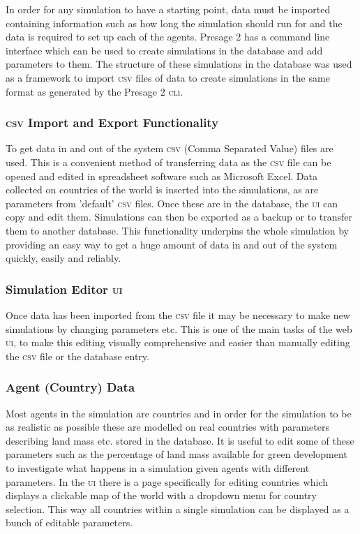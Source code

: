 In order for any simulation to have a starting point, data must be imported containing information such as how long the simulation should run for and the data is required to set up each of the agents. Presage 2 has a command line interface which can be used to create simulations in the database and add parameters to them. The structure of these simulations in the database was used as a framework to import \textsc{csv} files of data to create simulations in the same format as generated by the Presage 2 \textsc{cli}.

\subsubsection{\textsc{csv} Import and Export Functionality}

To get data in and out of the system \textsc{csv} (Comma Separated Value) files are used. This is a convenient method of transferring data as the \textsc{csv} file can be opened and edited in spreadsheet software such as Microsoft Excel. Data collected on countries of the world is inserted into the simulations, as are parameters from 'default' \textsc{csv} files. Once these are in the database, the \textsc{ui} can copy and edit them. Simulations can then be exported as a backup or to transfer them to another database. This functionality underpins the whole simulation by providing an easy way to get a huge amount of data in and out of the system quickly, easily and reliably.

\subsubsection{Simulation Editor \textsc{ui}}

Once data has been imported from the \textsc{csv} file it may be necessary to make new simulations by changing parameters etc. This is one of the main tasks of the web \textsc{ui}, to make this editing visually comprehensive and easier than manually editing the \textsc{csv} file or the database entry.

\subsubsection{Agent (Country) Data}

Most agents in the simulation are countries and in order for the simulation to be as realistic as possible these are modelled on real countries with parameters describing land mass etc. stored in the database. It is useful to edit some of these parameters such as the percentage of land mass available for green development to investigate what happens in a simulation given agents with different parameters. In the \textsc{ui} there is a page specifically for editing countries which displays a clickable map of the world with a dropdown menu for country selection. This way all countries within a single simulation can be displayed as a bunch of editable parameters.

